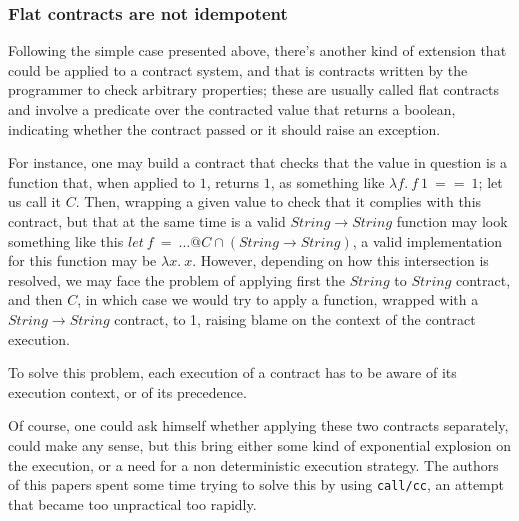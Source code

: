 
\subsubsection*{Flat contracts are not idempotent}

Following the simple case presented above, there's another kind of extension that could be
applied to a contract system, and that is contracts written by the
programmer to check arbitrary properties; these are usually called flat contracts and
involve a predicate over the contracted value that returns a boolean, indicating whether
the contract passed or it should raise an exception.

For instance, one may build a contract that checks that the value in question is a
function that, when applied to $1$, returns $1$, as something like
$\lambda f.~f~1~==~1$; let us call it $C$.
Then, wrapping a given value to check that it complies with this contract, but that at
the same time is a valid $String \rightarrow String$ function may look something like this
$let~f~=~...@C \cap (String \rightarrow String)$, a valid implementation for this function
may be $\lambda x.~x$.
However, depending on how this intersection is resolved, we may face the problem of applying first
the $String$ to $String$ contract, and then $C$, in which case we would try to apply a function,
wrapped with a $String \rightarrow String$ contract, to 1, raising blame on the context
of the contract execution.

To solve this problem, each execution of a contract has to be aware of its execution context,
or of its precedence.




Of course, one could ask himself whether applying these two contracts separately,
could make any sense, but this bring either some kind of exponential explosion
on the execution, or a need for a non deterministic execution
strategy.
The authors of this papers spent some time trying to solve this by using
\texttt{call/cc}, an attempt that became too unpractical too rapidly.

